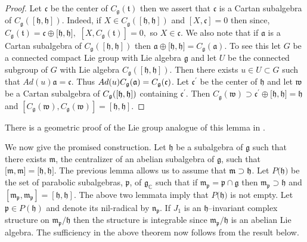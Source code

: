 \documentclass{amse-new}
\numberwithin{equation}{section} %
\begin{document}
\begin{proof}
Let $\mathfrak{c}$ be the center of $C_{\mathfrak{g}}(\mathfrak{t})$ then we
assert that $\mathfrak{c}$ is a Cartan subalgebra of $C_{\mathfrak{g}}([%
\mathfrak{h},\mathfrak{h}]).$ Indeed, if $X\in C_{\mathfrak{g}}([\mathfrak{h}%
,\mathfrak{h}])$ and $[X,\mathfrak{c}]=0$ then since, $C_{\mathfrak{g}}(%
\mathfrak{t})=\mathfrak{c}\oplus \mathfrak{[\mathfrak{h}},\mathfrak{h}],$ $%
[X,C_{\mathfrak{g}}(\mathfrak{t})]=0,$ so $X\in \mathfrak{c}$. We also note
that if $\mathfrak{a}$ is a Cartan subalgebra of $C_{\mathfrak{g}}([%
\mathfrak{h},\mathfrak{h}])$ then $\mathfrak{a}\oplus \lbrack \mathfrak{h},%
\mathfrak{h}]=C_{\mathfrak{g}}(\mathfrak{a})$. To see this let $G$ be a
connected compact Lie group with Lie algebra $\mathfrak{g}$ and let $U$ be
the connected subgroup of $G$ with Lie algebra $C_{\mathfrak{g}}([\mathfrak{h%
},\mathfrak{h}])$. Then there exists $u\in U\subset G$ such that $Ad(u)%
\mathfrak{a=\mathfrak{c}}$. Thus $Ad(u)C_{\mathfrak{g}}(\mathfrak{a})=C_{%
\mathfrak{g}}(\mathfrak{c})$. Let $\mathfrak{c}^{\prime }$ be the center of $%
\mathfrak{h}$ and let $\mathfrak{w}$ be a Cartan subalgebra of $C_{\mathfrak{%
g}}([\mathfrak{h},\mathfrak{h}])$ containing $\mathfrak{c}^{\prime }$. Then $%
C_{\mathfrak{g}}(\mathfrak{w})\supset \mathfrak{c}^{\prime }\oplus \lbrack
\mathfrak{h},\mathfrak{h}]=\mathfrak{h}$ and $[C_{\mathfrak{g}}(\mathfrak{w}%
),C_{\mathfrak{g}}(\mathfrak{w})]=[\mathfrak{h},\mathfrak{h}]$.
\end{proof}
There is a  geometric proof of the Lie group analogue of this lemma in \cite{HK}.

We now give the promised construction. Let $\mathfrak{h}$ be a subalgebra of
$\mathfrak{g}$ such that there exists $\mathfrak{m}$, the centralizer of an
abelian subalgebra of $\mathfrak{g}$, such that $[\mathfrak{m}, \mathfrak{m]=}%
[\mathfrak{h}, \mathfrak{h]}$. The previous lemma allows us to assume that
$\frak{m}\supset \frak h$.  Let $P(\mathfrak{h)}$ be the set of parabolic
subalgebras, $\mathfrak{p}$, of $\mathfrak{g}_{\mathbb{C}}$ such that if
$\mathfrak{m}_{\mathfrak{p}}=\mathfrak{p\cap\mathfrak{g}}$ then  $\mathfrak{m}_{\mathfrak{p}} \supset \mathfrak{h} $ and $[\mathfrak{m}%
_{\mathfrak{p}},\mathfrak{m}_{\mathfrak{p}}]=[\mathfrak{h},\mathfrak{h}]$.  The above two lemmata imply that $P(\mathfrak{h)}$ is not empty.
Let $\mathfrak{p}\in P(\mathfrak{h})$ and  denote its nil-radical by $\mathfrak{n}_{\mathfrak{p}}$.
If $J_{1}$ is an $\mathfrak{h}$--invariant complex structure on
$\mathfrak{m}_{\mathfrak{p}}/\mathfrak{h}$ then the structure is integrable
since $\mathfrak{m}_{\mathfrak{p}}/\mathfrak{h}$ is an abelian Lie algebra.
The sufficiency in the above theorem now follows from the result below.
\end{document}
